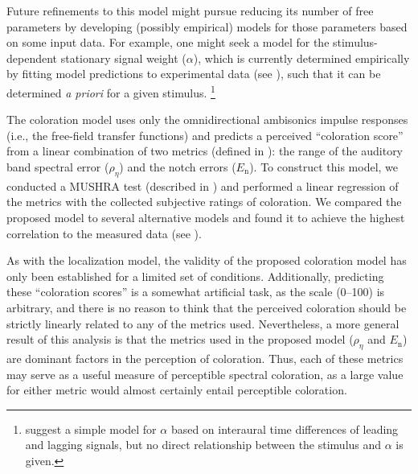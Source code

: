 Future refinements to this model might pursue reducing its number of free parameters by developing (possibly empirical) models for those parameters based on some input data.
For example, one might seek a model for the stimulus-dependent stationary signal weight ($\alpha$), which is currently determined empirically by fitting model predictions to experimental data (see \citet{Stitt2016,Stitt2017}), such that it can be determined \textit{a priori} for a given stimulus.%
\footnote{\citet{Stitt2016} suggest a simple model for $\alpha$ based on interaural time differences of leading and lagging signals, but no direct relationship between the stimulus and $\alpha$ is given.}

The coloration model uses only the omnidirectional ambisonics impulse responses (i.e., the free-field transfer functions) and predicts a perceived ``coloration score'' from a linear combination of two metrics (defined in ): the range of the auditory band spectral error ($\rho_\eta$) and the notch errors ($E_\text{n}$).
To construct this model, we conducted a MUSHRA \citep{ITU-R-BS.1534-3} test (described in ) and performed a linear regression of the metrics with the collected subjective ratings of coloration.
We compared the proposed model to several alternative models and found it to achieve the highest correlation to the measured data (see ).

As with the localization model, the validity of the proposed coloration model has only been established for a limited set of conditions.
Additionally, predicting these ``coloration scores'' is a somewhat artificial task, as the scale (0--100) is arbitrary, and there is no reason to think that the perceived coloration should be strictly linearly related to any of the metrics used.
Nevertheless, a more general result of this analysis is that the metrics used in the proposed model ($\rho_\eta$ and $E_\text{n}$) are dominant factors in the perception of coloration.
Thus, each of these metrics may serve as a useful measure of perceptible spectral coloration, as a large value for either metric would almost certainly entail perceptible coloration.

